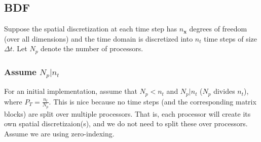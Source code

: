 \documentclass[a4paper,12pt]{article}
\begin{document}
\subsection{BDF}

Suppose the spatial discretization at each time step has $n_{\mathbf{x}}$ degrees of freedom (over all dimensions) and the time domain
is discretized into $n_t$ time steps of size $\Delta t$. Let $N_p$ denote the number of processors.


%
%
%

\subsubsection{Assume $N_p | n_t$}

For an initial implementation, assume that $N_p < n_t$ and $N_p | n_t$ ($N_p$ divides $n_t$), where $P_T = \frac{n_t}{N_p}$. This is nice
because no time steps (and the corresponding matrix blocks) are split over multiple processors. That is, each processor will create its own
spatial discretizaion(s), and we do not need to split these over processors. Assume we are using zero-indexing. 
\end{document}
